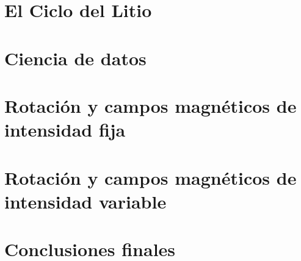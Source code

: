 \documentclass[print, color]{ugrTFG}
\begin{document}
\maketitle


\frontmatter %

   
            

                    
               

\mainmatter %

\part{El Ciclo del Litio} %



\cleardoublepage
\part{Ciencia de datos}




\cleardoublepage
\part{Rotación y campos magnéticos de intensidad fija}



\cleardoublepage
\part{Rotación y campos magnéticos de intensidad variable}



\cleardoublepage
\part{Conclusiones finales}

\end{document}
